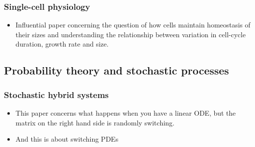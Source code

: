 \documentclass{amsart}
\begin{document}
\subsubsection{Single-cell physiology}
\begin{itemize}
\item \cite{amir2014} Influential paper concerning the question of how cells maintain homeostasis of their sizes and understanding the relationship between variation in cell-cycle duration, growth rate and size. 
\end{itemize}

%


\subsection{Probability theory and stochastic processes}



\subsubsection{Stochastic hybrid systems}
\begin{itemize}
\item \cite{lawley2013} This paper concerns what happens when you have a linear ODE, but the matrix on the right hand side is randomly switching. 
\item \cite{lawley2016} And this is about switching PDEs
\end{itemize}
\end{document}
